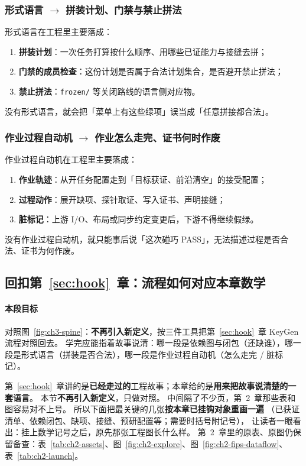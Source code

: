 \documentclass[UTF8,a4paper,11pt]{ctexart}
\theoremstyle{definition}
\theoremstyle{plain}
\theoremstyle{remark}
\numberwithin{figure}{section}
\numberwithin{table}{section}
\begin{document}
\subsubsection{形式语言 $\to$ 拼装计划、门禁与禁止拼法}
\label{sec:tool-lang-eng}

形式语言在工程里主要落成：
\begin{enumerate}
  \item \textbf{拼装计划}：一次任务打算按什么顺序、用哪些已证能力与接缝去拼；
  \item \textbf{门禁的成员检查}：这份计划是否属于合法计划集合，是否避开禁止拼法；
  \item \textbf{禁止拼法}：\texttt{frozen/} 等关闭路线的语言侧对应物。
\end{enumerate}
没有形式语言，就会把「菜单上有这些绿项」误当成「任意拼接都合法」。


\subsubsection{作业过程自动机 $\to$ 作业怎么走完、证书何时作废}
\label{sec:tool-auto-eng}

作业过程自动机在工程里主要落成：
\begin{enumerate}
  \item \textbf{作业轨迹}：从开任务配置走到「目标获证、前沿清空」的接受配置；
  \item \textbf{过程动作}：展开缺项、探针取证、写入证书、声明接缝；
  \item \textbf{脏标记}：上游 I/O、布局或同步约定变更后，下游不得继续假绿。
\end{enumerate}
没有作业过程自动机，就只能事后说「这次碰巧 PASS」，无法描述过程是否合法、证书为何作废。

\subsection{回扣第~\ref{sec:hook}~章：流程如何对应本章数学}
\label{sec:mathbg-hookback}

\paragraph{本段目标}
对照图~\ref{fig:ch3-spine}：\textbf{不再引入新定义}，按三件工具把第~\ref{sec:hook}~章 KeyGen 流程对照回去。
学完应能指着故事说清：哪一段是依赖图与闭包（还缺谁），哪一段是形式语言（拼装是否合法），哪一段是作业过程自动机（怎么走完 / 脏标记）。

第~\ref{sec:hook}~章讲的是\textbf{已经走过的}工程故事；本章给的是\textbf{用来把故事说清楚的一套语言}。
本节\textbf{不再引入新定义}，只做对照。
中间隔了不少页，第~2~章那些表和图容易对不上号。
所以下面把最关键的几张\textbf{按本章已挂钩对象重画一遍}
（已获证清单、依赖闭包、缺项、接缝、预研配置等；需要时括号附记号），
让读者一眼看出：挂上数学记号之后，原先那张工程图长什么样。
第~2~章里的原表、原图仍保留备查：表~\ref{tab:ch2-assets}、图~\ref{fig:ch2-explore}、图~\ref{fig:ch2-fips-dataflow}、表~\ref{tab:ch2-launch}。
\end{document}
